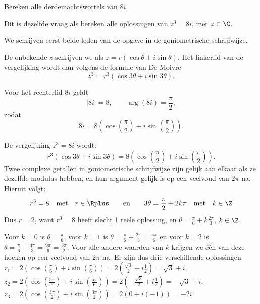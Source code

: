 \documentclass{ximera}
\begin{document}
\begin{basicSkip}
    \begin{exercise} Bereken alle derdemachtswortels van $8i$.
    \begin{hint} Dit is dezelfde vraag als bereken alle oplossingen van $z^3=8i$, met $z\in \C$.\end{hint}
        \begin{oplossing}
            We schrijven eerst beide leden van de opgave in de goniometrische schrijfwijze.
             
            De onbekende $z$ schrijven we als $z = r(\cos\theta+i\sin\theta)$. Het linkerlid van de vergelijking wordt dan volgens de formule van De Moivre $$z^3 = r^3 (\cos 3\theta+i\sin 3\theta).$$
             
            Voor het rechterlid $8i$ geldt
            \[ |8i| = 8, \qquad \arg (8i) =  \frac{\pi}{2}, \]
            zodat
            \[ 8i = 8( \cos(\frac{\pi}{2}) + i \sin(\frac{\pi}{2})). \]
             
            De
            vergelijking $z^3=8i$ wordt:
            $$r^3 (\cos 3\theta+i\sin 3\theta) = 8( \cos(\frac{\pi}{2}) + i \sin(\frac{\pi}{2})).$$
            Twee complexe getallen in goniometrische schrijfwijze zijn gelijk aan elkaar als ze dezelfde modulus hebben, en hun argument gelijk is op een veelvoud van $2 \pi$ na.
            Hieruit volgt:
            \[ r^3 = 8 \quad \text{met} \quad r\in \Rplus \qquad \text{en} \qquad 3 \theta =  \frac{\pi}{2} + 2 k \pi \quad \text{met} \quad k\in \Z\]
            Dus $r= 2$, want $r^3=8$ heeft slecht 1 reële oplossing, en $\theta =  \frac{\pi}{6} + k \frac{2\pi}{3}$, $k \in \Z$.
             
            Voor $k=0$ is
            $\theta =  \frac{\pi}{6}$, voor $k=1$ is $\theta =
            \frac{\pi}{6} + \frac{2\pi}{3} = \frac{5\pi}{6}$ en voor $k=2$ is $\theta =
            \frac{\pi}{6} + \frac{4\pi}{3} = \frac{9\pi}{6} = \frac{3\pi}{2}$. Voor alle andere waarden van $k$ krijgen we één van deze hoeken op een veelvoud van $2 \pi$ na. Er zijn dus drie verschillende oplossingen
            \\$ z_1 = 2( \cos(\frac{\pi}{6}) + i \sin(\frac{\pi}{6}))   = 2(\frac{\sqrt3}{2} + i \frac12)= \sqrt 3 + i$,
            \\$ z_2 = 2( \cos(\frac{5\pi}{6}) + i \sin(\frac{5\pi}{6})) =2(- \frac{\sqrt3}{2} + i \frac12)=-\sqrt 3 +i $,
            \\$ z_3 = 2( \cos(\frac{3\pi}{2}) + i \sin(\frac{3\pi}{2})) =2(0 + i (-1))=-2i $.
        \end{oplossing}
        \end{exercise}
    \end{basicSkip}
\end{document}
